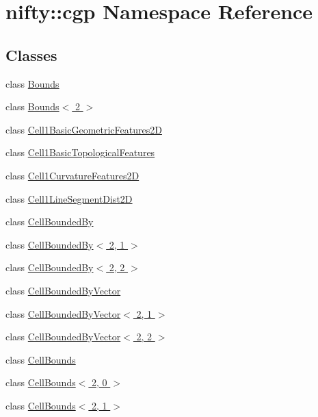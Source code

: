 \hypertarget{namespacenifty_1_1cgp}{}\section{nifty\+:\+:cgp Namespace Reference}
\label{namespacenifty_1_1cgp}
\subsection*{Classes}
\begin{DoxyCompactItemize}
\item 
class \hyperlink{classnifty_1_1cgp_1_1Bounds}{Bounds}
\item 
class \hyperlink{classnifty_1_1cgp_1_1Bounds_3_012_01_4}{Bounds$<$ 2 $>$}
\item 
class \hyperlink{classnifty_1_1cgp_1_1Cell1BasicGeometricFeatures2D}{Cell1\+Basic\+Geometric\+Features2\+D}
\item 
class \hyperlink{classnifty_1_1cgp_1_1Cell1BasicTopologicalFeatures}{Cell1\+Basic\+Topological\+Features}
\item 
class \hyperlink{classnifty_1_1cgp_1_1Cell1CurvatureFeatures2D}{Cell1\+Curvature\+Features2\+D}
\item 
class \hyperlink{classnifty_1_1cgp_1_1Cell1LineSegmentDist2D}{Cell1\+Line\+Segment\+Dist2\+D}
\item 
class \hyperlink{classnifty_1_1cgp_1_1CellBoundedBy}{Cell\+Bounded\+By}
\item 
class \hyperlink{classnifty_1_1cgp_1_1CellBoundedBy_3_012_00_011_01_4}{Cell\+Bounded\+By$<$ 2, 1 $>$}
\item 
class \hyperlink{classnifty_1_1cgp_1_1CellBoundedBy_3_012_00_012_01_4}{Cell\+Bounded\+By$<$ 2, 2 $>$}
\item 
class \hyperlink{classnifty_1_1cgp_1_1CellBoundedByVector}{Cell\+Bounded\+By\+Vector}
\item 
class \hyperlink{classnifty_1_1cgp_1_1CellBoundedByVector_3_012_00_011_01_4}{Cell\+Bounded\+By\+Vector$<$ 2, 1 $>$}
\item 
class \hyperlink{classnifty_1_1cgp_1_1CellBoundedByVector_3_012_00_012_01_4}{Cell\+Bounded\+By\+Vector$<$ 2, 2 $>$}
\item 
class \hyperlink{classnifty_1_1cgp_1_1CellBounds}{Cell\+Bounds}
\item 
class \hyperlink{classnifty_1_1cgp_1_1CellBounds_3_012_00_010_01_4}{Cell\+Bounds$<$ 2, 0 $>$}
\item 
class \hyperlink{classnifty_1_1cgp_1_1CellBounds_3_012_00_011_01_4}{Cell\+Bounds$<$ 2, 1 $>$}

\end{DoxyCompactItemize}
